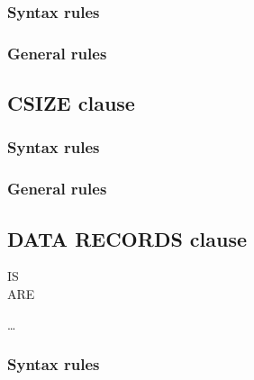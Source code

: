 \subsubsection{Syntax rules}

\subsubsection{General rules}

\subsection{CSIZE clause}

\begin{syntax}[\miscextcolour]
\end{syntax}

\subsubsection{Syntax rules}

\subsubsection{General rules}

\subsection{DATA RECORDS clause}

\begin{syntax}[\deletedcolour]
  \begin{1=}
     IS \\
     ARE
  \end{1=}
  \begin{1=}
    \identifier
  \end{1=}\ldots
\end{syntax}

\subsubsection{Syntax rules}


